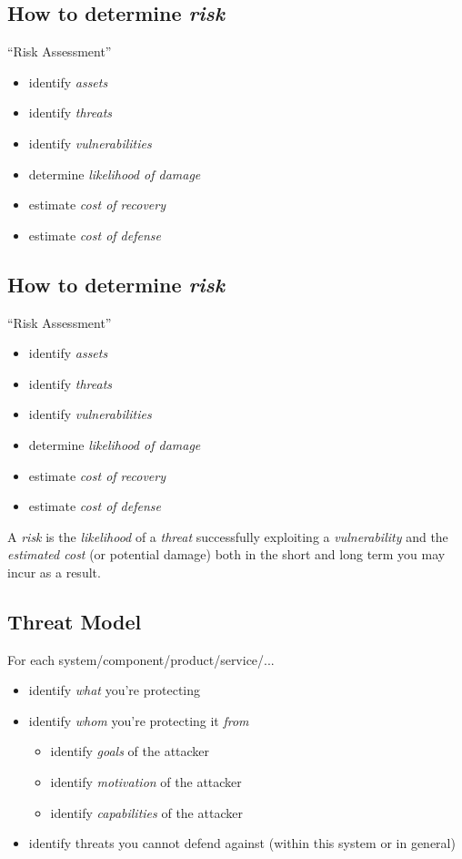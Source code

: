 \documentclass[xga]{xdvislides}
\begin{document}
\subsection{How to determine {\em risk}}
``Risk Assessment''
\begin{itemize}
	\item identify {\em assets}
	\item identify {\em threats}
	\item identify {\em vulnerabilities}
	\item determine {\em likelihood of damage}
	\item estimate {\em cost of recovery}
	\item estimate {\em cost of defense}
\end{itemize}

\subsection{How to determine {\em risk}}
``Risk Assessment''
\begin{itemize}
	\item identify {\em assets}
	\item identify {\em threats}
	\item identify {\em vulnerabilities}
	\item determine {\em likelihood of damage}
	\item estimate {\em cost of recovery}
	\item estimate {\em cost of defense}
\end{itemize}
\vspace{.5in}

A {\em risk} is the {\em likelihood} of a {\em threat} successfully exploiting
a {\em vulnerability} and the {\em estimated cost} (or potential damage) both
in the short and long term you may incur as a result.

\subsection{Threat Model}
For each system/component/product/service/...

\begin{itemize}
	\item identify {\em what} you're protecting
	\item identify {\em whom} you're protecting it {\em from}
		\begin{itemize}
			\item identify {\em goals} of the attacker
			\item identify {\em motivation} of the attacker
			\item identify {\em capabilities} of the attacker
		\end{itemize}
	\item identify threats you cannot defend against (within this
		system or in general)
\end{itemize}
\end{document}
